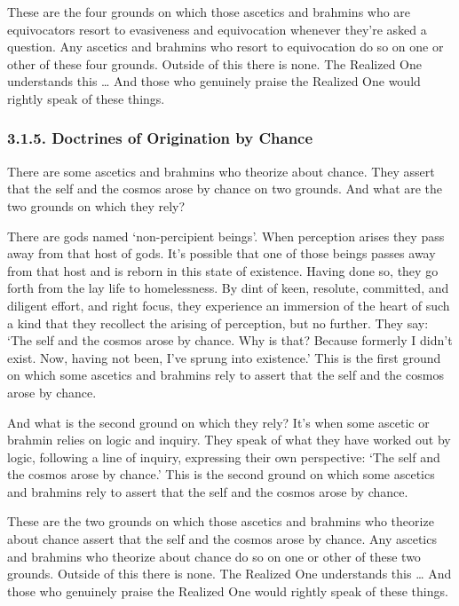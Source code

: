 \documentclass[12pt,openany]{book}%
\begin{document}
These are the four grounds on which those ascetics and brahmins who are equivocators resort to evasiveness and equivocation whenever they’re asked a question. Any ascetics and brahmins who resort to equivocation do so on one or other of these four grounds. Outside of this there is none. The Realized One understands this … And those who genuinely praise the Realized One would rightly speak of these things. 

\subsubsection*{3.1.5. Doctrines of Origination by Chance }

There are some ascetics and brahmins who theorize about chance. They assert that the self and the cosmos arose by chance on two grounds. And what are the two grounds on which they rely? 

There are gods named ‘non-percipient beings’. When perception arises they pass away from that host of gods. It’s possible that one of those beings passes away from that host and is reborn in this state of existence. Having done so, they go forth from the lay life to homelessness. By dint of keen, resolute, committed, and diligent effort, and right focus, they experience an immersion of the heart of such a kind that they recollect the arising of perception, but no further. They say: ‘The self and the cosmos arose by chance. Why is that? Because formerly I didn’t exist. Now, having not been, I’ve sprung into existence.’ This is the first ground on which some ascetics and brahmins rely to assert that the self and the cosmos arose by chance. 

And what is the second ground on which they rely? It’s when some ascetic or brahmin relies on logic and inquiry. They speak of what they have worked out by logic, following a line of inquiry, expressing their own perspective: ‘The self and the cosmos arose by chance.’ This is the second ground on which some ascetics and brahmins rely to assert that the self and the cosmos arose by chance. 

These are the two grounds on which those ascetics and brahmins who theorize about chance assert that the self and the cosmos arose by chance. Any ascetics and brahmins who theorize about chance do so on one or other of these two grounds. Outside of this there is none. The Realized One understands this … And those who genuinely praise the Realized One would rightly speak of these things. 
\end{document}
